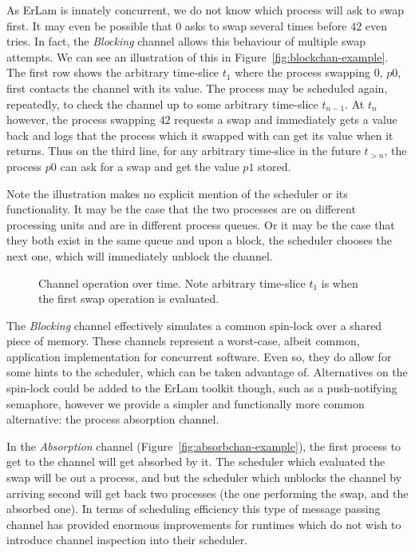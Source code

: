 As ErLam is innately concurrent, we do not know which process will ask to swap
first. It may even be possible that $0$ asks to swap several times before $42$
even tries. In fact, the {\sl Blocking} channel allows this behaviour of 
multiple swap attempts.
We can see an illustration of this in Figure~\ref{fig:blockchan-example}.
The first row shows the arbitrary time-slice $t_1$ where the process swapping $0$, 
$p0$, first contacts the channel with its value. The process may be scheduled again,
repeatedly, to check the channel up to some arbitrary time-slice $t_{n-1}$. At
$t_n$ however, the process swapping $42$ requests a swap and immediately gets a
value back and logs that the process which it swapped with can get its value
when it returns. Thus on the third line, for any arbitrary time-slice in the 
future $t_{>n}$, the process $p0$ can ask for a swap and get the value $p1$ 
stored.

Note the illustration makes no explicit mention of the scheduler or its 
functionality. It may be the case that the two processes are on different 
processing units and are in different process queues. 
Or it may be the case that they both exist in the
same queue and upon a block, the scheduler chooses the next one, which will 
immediately unblock the channel.

\begin{figure}
\caption{Channel operation over time. Note arbitrary time-slice $t_1$ is when the 
first swap operation is evaluated.}
\end{figure}

The {\sl Blocking} channel effectively simulates a common spin-lock over a shared 
piece of memory. These channels represent a worst-case, albeit common, application 
implementation for concurrent software. Even so, they do allow for some hints
to the scheduler, which can be taken advantage of. Alternatives on the spin-lock 
could be added to the ErLam toolkit though, such as a push-notifying semaphore, 
however we provide a simpler and functionally more common alternative: the process 
absorption channel.

In the {\sl Absorption} channel (Figure~\ref{fig:absorbchan-example}), the first 
process to get to the channel will get absorbed by it. The scheduler which 
evaluated the swap will be out a process, and but the scheduler which unblocks the channel 
by arriving second will get back two processes (the one performing the swap, 
and the absorbed one). In terms of scheduling efficiency this type of message
passing channel has provided enormous improvements for runtimes which do not
wish to introduce channel inspection into their scheduler.

